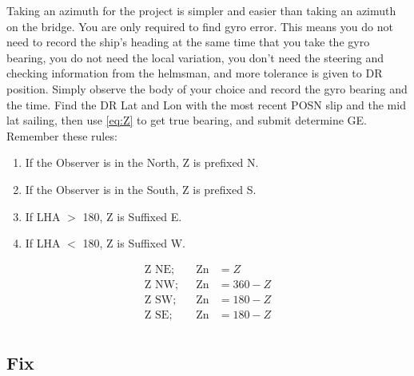 \documentclass[letterpaper,12pt]{article}
\begin{document}
Taking an azimuth for the project is simpler and easier than taking an azimuth on the bridge.
You are only required to find gyro error.
This means you do not need to record the ship's heading at the same time that you take the gyro bearing, you do not need the local variation, you don't need the steering and checking information from the helmsman, and more tolerance is given to DR position.
Simply observe the body of your choice and record the gyro bearing and the time.
Find the DR Lat and Lon with the most recent POSN slip and the mid lat sailing, then use \ref{eq:Z} to get true bearing, and submit determine GE.
Remember these rules:
\begin{enumerate}
	\item If the Observer is in the North, Z is prefixed N.
	\item If the Observer is in the South, Z is prefixed S.
	\item If LHA $>$ 180, Z is Suffixed E.
	\item If LHA $<$ 180, Z is Suffixed W.
\end{enumerate}
\begin{align*}
	\text{Z NE};&		&\text{Zn}&=Z\\
	\text{Z NW};&		&\text{Zn}&=360-Z\\
	\text{Z SW};&		&\text{Zn}&=180-Z\\
	\text{Z SE};&		&\text{Zn}&=180-Z\\
\end{align*}
\subsection{Fix}
\end{document}
